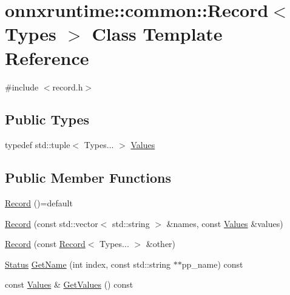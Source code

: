 \hypertarget{classonnxruntime_1_1common_1_1Record}{}\section{onnxruntime\+:\+:common\+:\+:Record$<$ Types $>$ Class Template Reference}
\label{classonnxruntime_1_1common_1_1Record}


{\ttfamily \#include $<$record.\+h$>$}

\subsection*{Public Types}
\begin{DoxyCompactItemize}
\item 
typedef std\+::tuple$<$ Types... $>$ \mbox{\hyperlink{classonnxruntime_1_1common_1_1Record_adf21ddd0ae1bfd54963165bde0b417d7}{Values}}
\end{DoxyCompactItemize}
\subsection*{Public Member Functions}
\begin{DoxyCompactItemize}
\item 
\mbox{\hyperlink{classonnxruntime_1_1common_1_1Record_a0c48360a12cb27f6b629597a39594bfe}{Record}} ()=default
\item 
\mbox{\hyperlink{classonnxruntime_1_1common_1_1Record_aceab9dca4d56c06ba4b03efce0ec6551}{Record}} (const std\+::vector$<$ std\+::string $>$ \&names, const \mbox{\hyperlink{classonnxruntime_1_1common_1_1Record_adf21ddd0ae1bfd54963165bde0b417d7}{Values}} \&values)
\item 
\mbox{\hyperlink{classonnxruntime_1_1common_1_1Record_a3639716e0101db2c3bb0dc821f26dd0c}{Record}} (const \mbox{\hyperlink{classonnxruntime_1_1common_1_1Record}{Record}}$<$ Types... $>$ \&other)
\item 
\mbox{\hyperlink{classonnxruntime_1_1common_1_1Status}{Status}} \mbox{\hyperlink{classonnxruntime_1_1common_1_1Record_aa90ebb80f43a3ed7f626a39c8f139812}{Get\+Name}} (int index, const std\+::string $\ast$$\ast$pp\+\_\+name) const
\item 
const \mbox{\hyperlink{classonnxruntime_1_1common_1_1Record_adf21ddd0ae1bfd54963165bde0b417d7}{Values}} \& \mbox{\hyperlink{classonnxruntime_1_1common_1_1Record_ac05fe4d52b275bf655b5d18503c6b0b5}{Get\+Values}} () const
\end{DoxyCompactItemize}


